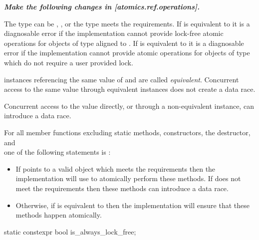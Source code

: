 \textbf{\textit{Make the following changes in [atomics.ref.operations].}} \\

\begin{addedblock}
\pnum
The type  can be ,
, or the type  meets the
 requirements.  
If  is equivalent to  
it is a diagnosable error if the implementation cannot provide lock-free atomic
operations for  objects of type  aligned to
.
If  is equivalent to  
it is a diagnosable error if the implementation cannot provide atomic
operations for  objects of type  which do not require a user provided
lock.

\pnum
{} instances referencing the same value of  and  are 
called \textit{equivalent}. Concurrent access to the same value through 
equivalent  instances does not create a data race. 
\begin{note} Concurrent access to the value directly, or through a non-equivalent
 instance, can introduce a data race.
\end{note}

\pnum
For all  member functions excluding static methods, constructors, 
the destructor, and \\  one of the following statements is :
\begin{itemize}
\item If  points to a valid  object which meets the 
 requirements then 
the implementation will use  to atomically perform these methods.
If  does not meet the  requirements then 
these methods can introduce a data race.
\item Otherwise, if  is equivalent to  then
the implementation will ensure that these methods happen atomically.
\end{itemize}
\end{addedblock}

\begin{itemdecl}
static constexpr bool is_always_lock_free;
\end{itemdecl}

